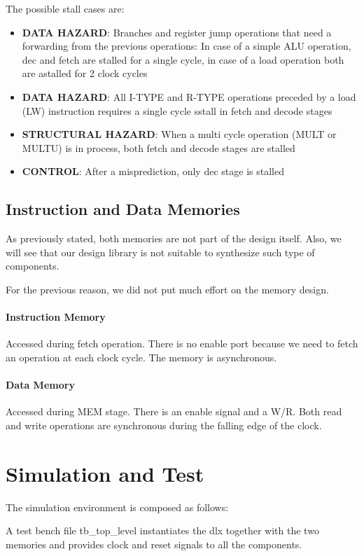 \documentclass[12pt]{article}
\begin{document}
The possible stall cases are:
\begin{itemize}
	\item \textbf{DATA HAZARD}: Branches and register jump operations that need a forwarding from the previous operations: In case of a simple ALU operation, dec and fetch are stalled for a single cycle, in case of a load operation both are astalled for 2 clock cycles
	\item \textbf{DATA HAZARD}: All I-TYPE and R-TYPE operations preceded by a load (LW) instruction requires a single cycle sstall in fetch and decode stages
	\item \textbf{STRUCTURAL HAZARD}: When a multi cycle operation (MULT or MULTU) is in process, both fetch and decode stages are stalled
	\item \textbf{CONTROL}: After a misprediction, only dec stage is stalled  
\end{itemize}

\subsection{Instruction and Data Memories}

As previously stated, both memories are not part of the design itself.
Also, we will see that our design library is not suitable to synthesize such type of components.

For the previous reason, we did not put much effort on the memory design.

\paragraph{Instruction Memory} Accessed during fetch operation. There is no enable port because we need to fetch an operation at each clock cycle. The memory is asynchronous.
\paragraph{Data Memory} Accessed during MEM stage. There is an enable signal and a W/R. Both read and write operations are synchronous during the falling edge of the clock.


\section{Simulation and Test}\label{Simulation}
The simulation environment is composed as follows:

A test bench file {tb\_top\_level} instantiates the dlx together with the two memories and provides clock and reset signals to all the components.
\end{document}
